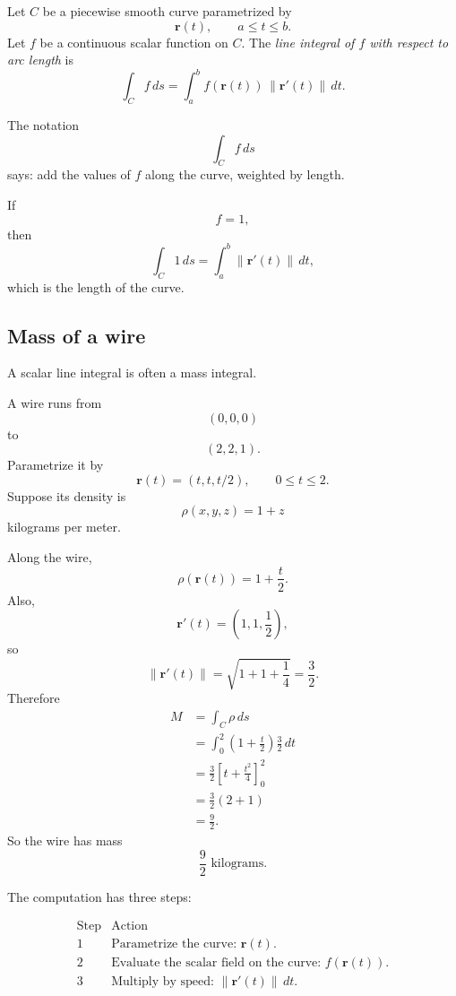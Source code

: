 \begin{definition}
Let \(C\) be a piecewise smooth curve parametrized by
\[
    \mathbf r(t),\qquad a\le t\le b.
\]
Let \(f\) be a continuous scalar function on \(C\).  The \emph{line integral of \(f\)
with respect to arc length} is
\[
\boxed{
    \int_C f\,ds
    =
    \int_a^b f(\mathbf r(t))\,\|\mathbf r'(t)\|\,dt.
}
\]
\end{definition}

The notation
\[
    \int_C f\,ds
\]
says: add the values of \(f\) along the curve, weighted by length.

If
\[
    f=1,
\]
then
\[
    \int_C 1\,ds
    =
    \int_a^b \|\mathbf r'(t)\|\,dt,
\]
which is the length of the curve.

\subsection{Mass of a wire}

A scalar line integral is often a mass integral.

\begin{example}
A wire runs from
\[
    (0,0,0)
\]
to
\[
    (2,2,1).
\]
Parametrize it by
\[
    \mathbf r(t)=(t,t,t/2),
    \qquad
    0\le t\le2.
\]
Suppose its density is
\[
    \rho(x,y,z)=1+z
\]
kilograms per meter.

Along the wire,
\[
    \rho(\mathbf r(t))=1+\frac t2.
\]
Also,
\[
    \mathbf r'(t)=\left(1,1,\frac12\right),
\]
so
\[
    \|\mathbf r'(t)\|
    =
    \sqrt{1+1+\frac14}
    =
    \frac32.
\]
Therefore
\[
\begin{aligned}
M
&=
\int_C \rho\,ds\\
&=
\int_0^2
\left(1+\frac t2\right)\frac32\,dt\\
&=
\frac32\left[t+\frac{t^2}{4}\right]_0^2\\
&=
\frac32(2+1)\\
&=
\frac92.
\end{aligned}
\]
So the wire has mass
\[
\boxed{
    \frac92 \text{ kilograms}.
}
\]
\end{example}

The computation has three steps:

\[
\begin{array}{c|c}
\text{Step} & \text{Action} \\ \hline
1 & \text{Parametrize the curve: }\mathbf r(t).\\[1mm]
2 & \text{Evaluate the scalar field on the curve: }f(\mathbf r(t)).\\[1mm]
3 & \text{Multiply by speed: }\|\mathbf r'(t)\|\,dt.
\end{array}
\]

